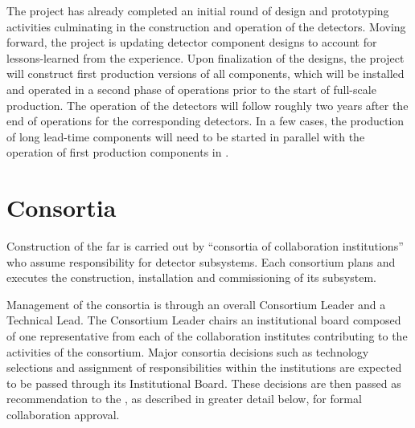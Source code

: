 The  project has already completed an initial round of design 
and prototyping activities culminating in the construction and operation 
of the  detectors.  Moving forward, the project is 
updating detector component designs to account for lessons-learned from 
the  experience.  Upon finalization of the designs, the 
project will construct first production versions of all components, which 
will be installed and operated in a second phase of  
operations prior to the start of full-scale production.  The operation 
of the  detectors will follow roughly two years after
the end of operations for the corresponding  detectors.
In a few cases, the production of long lead-time components will need to 
be started in parallel with the operation of first production components 
in .

\section{ Consortia}
\label{sec:consortia}

Construction of the  far  is carried out by 
``consortia of collaboration institutions'' who assume responsibility for 
detector subsystems.  Each consortium plans and executes the construction, 
installation and commissioning of its subsystem.

Management of the consortia is through an overall Consortium Leader and 
a Technical Lead.  The Consortium Leader chairs an institutional board 
composed of one representative from each of the collaboration institutes 
contributing to the activities of the consortium.  Major consortia decisions 
such as technology selections and assignment of responsibilities within 
the institutions are expected to be passed through its Institutional Board.  
These decisions are then passed as recommendation to the  
, as described in greater detail below, for formal collaboration 
approval.

